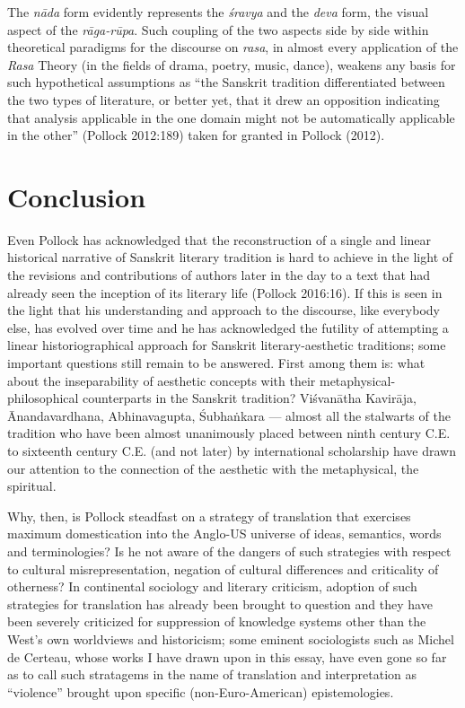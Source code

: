 The \textsl{nāda} form evidently represents the \textsl{śravya} and the \textsl{deva} form, the visual aspect of the \textsl{rāga-rūpa}. Such coupling of the two aspects side by side within theoretical paradigms for the discourse on \textsl{rasa}, in almost every application of the \textsl{Rasa} Theory (in the fields of drama, poetry, music, dance), weakens any basis for such hypothetical assumptions as “the Sanskrit tradition differentiated between the two types of literature, or better yet, that it drew an opposition indicating that analysis applicable in the one domain might not be automatically applicable in the other” (Pollock 2012:189) taken for granted in Pollock (2012).\\[-21pt]

\section*{Conclusion}

Even Pollock has acknowledged that the reconstruction of a single and linear historical narrative of Sanskrit literary tradition is hard to achieve in the light of the revisions and contributions of authors later in the day to a text that had already seen the inception of its literary life (Pollock 2016:16). If this is seen in the light that his understanding and approach to the discourse, like everybody else, has evolved over time and he has acknowledged the futility of attempting a linear historiographical approach for Sanskrit literary-aesthetic traditions; some important questions still remain to be answered. First among them is: what about the inseparability of aesthetic concepts with their metaphysical-philosophical counterparts in the Sanskrit tradition? Viśvanātha Kavirāja, Ānandavardhana, Abhinavagupta, Śubhaṅkara --- almost all the stalwarts of the tradition who have been almost unanimously placed between ninth century C.E. to sixteenth century C.E. (and not later) by international scholarship have drawn our attention to the connection of the aesthetic with the metaphysical, the spiritual. 

Why, then, is Pollock steadfast on a strategy of translation that exercises maximum domestication into the Anglo-US universe of ideas, semantics, words and terminologies? Is he not aware of the dangers of such strategies with respect to cultural misrepresentation, negation of cultural differences and criticality of otherness? In continental sociology and literary criticism, adoption of such strategies for translation has already been brought to question and they have been severely criticized for suppression of knowledge systems other than the West’s own worldviews and historicism; some eminent sociologists such as Michel de Certeau, whose works I have drawn upon in this essay, have even gone so far as to call such stratagems in the name of translation and interpretation as “violence” brought upon specific (non-Euro-American) epistemologies. 

